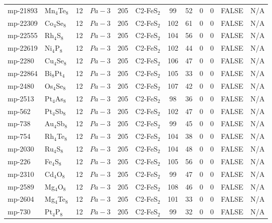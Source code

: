 {\begin{longtable}{llcccccccccc}
    mp-21893 & Mn$_{4}$Te$_{8}$ & 12    & $Pa-3$ & 205   & C2-FeS$_{2}$ & 99    & 52    & 0     & 0     & FALSE & N/A \\
    mp-22309 & Co$_{4}$Se$_{8}$ & 12    & $Pa-3$ & 205   & C2-FeS$_{2}$ & 102   & 61    & 0     & 0     & FALSE & N/A \\
    mp-22555 & Rh$_{4}$S$_{8}$ & 12    & $Pa-3$ & 205   & C2-FeS$_{2}$ & 104   & 56    & 0     & 0     & FALSE & N/A \\
    mp-22619 & Ni$_{4}$P$_{8}$ & 12    & $Pa-3$ & 205   & C2-FeS$_{2}$ & 102   & 44    & 0     & 0     & FALSE & N/A \\
    mp-2280 & Cu$_{4}$Se$_{8}$ & 12    & $Pa-3$ & 205   & C2-FeS$_{2}$ & 106   & 47    & 0     & 0     & FALSE & N/A \\
    mp-22864 & Bi$_{8}$Pt$_{4}$ & 12    & $Pa-3$ & 205   & C2-FeS$_{2}$ & 105   & 33    & 0     & 0     & FALSE & N/A \\
    mp-2480 & Os$_{4}$Se$_{8}$ & 12    & $Pa-3$ & 205   & C2-FeS$_{2}$ & 107   & 42    & 0     & 0     & FALSE & N/A \\
    mp-2513 & Pt$_{4}$As$_{8}$ & 12    & $Pa-3$ & 205   & C2-FeS$_{2}$ & 98    & 36    & 0     & 0     & FALSE & N/A \\
    mp-562 & Pt$_{4}$Sb$_{8}$ & 12    & $Pa-3$ & 205   & C2-FeS$_{2}$ & 102   & 47    & 0     & 0     & FALSE & N/A \\
    mp-738 & Au$_{4}$Sb$_{8}$ & 12    & $Pa-3$ & 205   & C2-FeS$_{2}$ & 99    & 45    & 0     & 0     & FALSE & N/A \\
    mp-754 & Rh$_{4}$Te$_{8}$ & 12    & $Pa-3$ & 205   & C2-FeS$_{2}$ & 104   & 38    & 0     & 0     & FALSE & N/A \\
    mp-2030 & Ru$_{4}$S$_{8}$ & 12    & $Pa-3$ & 205   & C2-FeS$_{2}$ & 104   & 48    & 0     & 0     & FALSE & N/A \\
    mp-226 & Fe$_{4}$S$_{8}$ & 12    & $Pa-3$ & 205   & C2-FeS$_{2}$ & 105   & 56    & 0     & 0     & FALSE & N/A \\
    mp-2310 & Cd$_{4}$O$_{8}$ & 12    & $Pa-3$ & 205   & C2-FeS$_{2}$ & 99    & 47    & 0     & 0     & FALSE & N/A \\
    mp-2589 & Mg$_{4}$O$_{8}$ & 12    & $Pa-3$ & 205   & C2-FeS$_{2}$ & 108   & 46    & 0     & 0     & FALSE & N/A \\
    mp-2604 & Mg$_{4}$Te$_{8}$ & 12    & $Pa-3$ & 205   & C2-FeS$_{2}$ & 101   & 33    & 0     & 0     & FALSE & N/A \\
    mp-730 & Pt$_{4}$P$_{8}$ & 12    & $Pa-3$ & 205   & C2-FeS$_{2}$ & 99    & 32    & 0     & 0     & FALSE & N/A \\

\end{longtable}}

